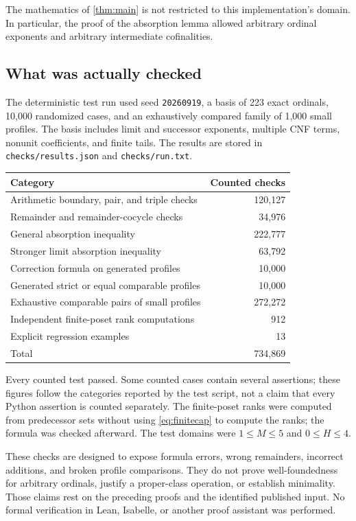 \documentclass[11pt,a4paper]{article}
\theoremstyle{definition}
\begin{document}
The mathematics of \cref{thm:main} is not restricted to this implementation's
domain. In particular, the proof of the absorption lemma allowed arbitrary
ordinal exponents and arbitrary intermediate cofinalities.

\subsection{What was actually checked}
The deterministic test run used seed \texttt{20260919}, a basis of 223 exact
ordinals, 10,000 randomized cases, and an exhaustively compared family of
1,000 small profiles. The basis includes limit and successor exponents,
multiple CNF terms, nonunit coefficients, and finite tails. The results are
stored in \texttt{checks/results.json} and \texttt{checks/run.txt}.

\begin{center}
\begin{tabular}{@{}lr@{}}
\toprule
Category & Counted checks\\
\midrule
Arithmetic boundary, pair, and triple checks & 120,127\\
Remainder and remainder-cocycle checks & 34,976\\
General absorption inequality & 222,777\\
Stronger limit absorption inequality & 63,792\\
Correction formula on generated profiles & 10,000\\
Generated strict or equal comparable profiles & 10,000\\
Exhaustive comparable pairs of small profiles & 272,272\\
Independent finite-poset rank computations & 912\\
Explicit regression examples & 13\\
\midrule
Total & 734,869\\
\bottomrule
\end{tabular}
\end{center}

Every counted test passed. Some counted cases contain several assertions;
these figures follow the categories reported by the test script, not a claim
that every Python assertion is counted separately. The finite-poset ranks
were computed from predecessor sets without using \eqref{eq:finitecap} to
compute the ranks; the formula was checked afterward. The test domains were
$1\le M\le5$ and $0\le H\le4$.

These checks are designed to expose formula errors, wrong remainders,
incorrect additions, and broken profile comparisons. They do not prove
well-foundedness for arbitrary ordinals, justify a proper-class operation,
or establish minimality. Those claims rest on the preceding proofs and
the identified published input. No formal verification in Lean, Isabelle,
or another proof assistant was performed.
\end{document}

